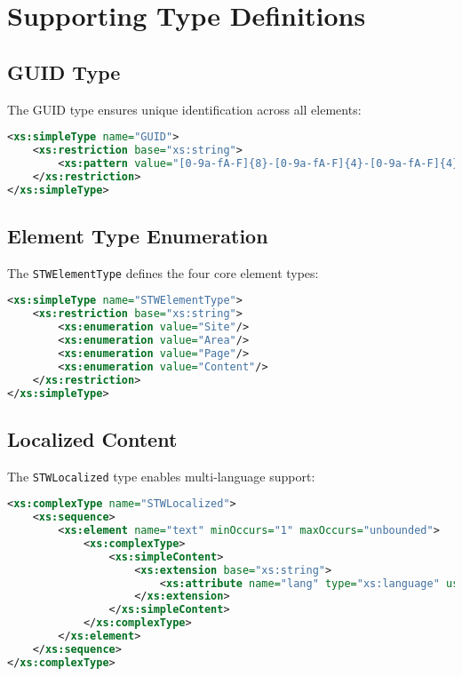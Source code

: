 \section{Supporting Type Definitions}

\subsection{GUID Type}

The GUID type ensures unique identification across all elements:

\begin{lstlisting}[language=XML,caption={GUID Type Definition}]
<xs:simpleType name="GUID">
    <xs:restriction base="xs:string">
        <xs:pattern value="[0-9a-fA-F]{8}-[0-9a-fA-F]{4}-[0-9a-fA-F]{4}-[0-9a-fA-F]{4}-[0-9a-fA-F]{12}" />
    </xs:restriction>
</xs:simpleType>
\end{lstlisting}

\subsection{Element Type Enumeration}

The \texttt{STWElementType} defines the four core element types:

\begin{lstlisting}[language=XML,caption={STWElementType Definition}]
<xs:simpleType name="STWElementType">
    <xs:restriction base="xs:string">
        <xs:enumeration value="Site"/>
        <xs:enumeration value="Area"/>
        <xs:enumeration value="Page"/>
        <xs:enumeration value="Content"/>
    </xs:restriction>
</xs:simpleType>
\end{lstlisting}

\subsection{Localized Content}

The \texttt{STWLocalized} type enables multi-language support:

\begin{lstlisting}[language=XML,caption={STWLocalized Type Definition}]
<xs:complexType name="STWLocalized">
    <xs:sequence>
        <xs:element name="text" minOccurs="1" maxOccurs="unbounded">
            <xs:complexType>
                <xs:simpleContent>
                    <xs:extension base="xs:string">
                        <xs:attribute name="lang" type="xs:language" use="required"/>
                    </xs:extension>
                </xs:simpleContent>
            </xs:complexType>
        </xs:element>
    </xs:sequence>
</xs:complexType>
\end{lstlisting}

